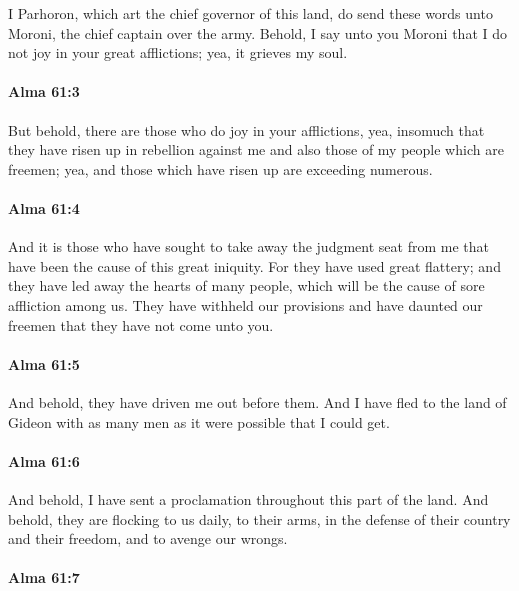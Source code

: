 			I Parhoron, which art the chief governor of this land,
			do send these words unto Moroni, the chief captain over the army.
			Behold, I say unto you Moroni
			that I do not joy in your great afflictions;
			yea, it grieves my soul.

		\paragraph{Alma 61:3} %
			\label{ALMA-61-3}

			But behold, there are those who do joy in your afflictions,
			yea, insomuch that they have risen up in rebellion against me
			and also those of my people which are freemen;
			yea, and those which have risen up are exceeding numerous.

		\paragraph{Alma 61:4} %
			\label{ALMA-61-4}

			And it is those who have sought to take away the judgment seat from me
			that have been the cause of this great iniquity.
			For they have used great flattery;
			and they have led away the hearts of many people,
			which will be the cause of sore affliction among us.
			They have withheld our provisions and have daunted our freemen
			that they have not come unto you.

		\paragraph{Alma 61:5} %
			\label{ALMA-61-5}

			And behold, they have driven me out before them.
			And I have fled to the land of Gideon
			with as many men as it were possible that I could get.

		\paragraph{Alma 61:6} %
			\label{ALMA-61-6}

			And behold, I have sent a proclamation throughout this part of the land.
			And behold, they are flocking to us daily, to their arms,
			in the defense of their country and their freedom,
			and to avenge our wrongs.

		\paragraph{Alma 61:7} %
			\label{ALMA-61-7}

